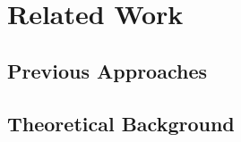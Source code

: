 \section{Related Work}
\label{sec:related}


\subsection{Previous Approaches}


\subsection{Theoretical Background}


